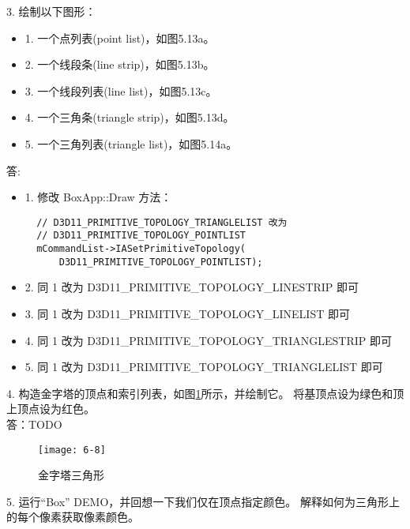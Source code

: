 \begin{flushleft}
3. 绘制以下图形：\\
\begin{itemize}
  \item 1. 一个点列表(point list)，如图5.13a。
  \item 2. 一个线段条(line strip)，如图5.13b。
  \item 3. 一个线段列表(line list)，如图5.13c。
  \item 4. 一个三角条(triangle strip)，如图5.13d。
  \item 5. 一个三角列表(triangle list)，如图5.14a。
\end{itemize}
答: \\
\begin{itemize}
  \item 1. 修改 BoxApp::Draw 方法：\\
  \begin{lstlisting}
  // D3D11_PRIMITIVE_TOPOLOGY_TRIANGLELIST 改为 
  // D3D11_PRIMITIVE_TOPOLOGY_POINTLIST
  mCommandList->IASetPrimitiveTopology(
      D3D11_PRIMITIVE_TOPOLOGY_POINTLIST);
  \end{lstlisting}
  \item 2. 同 1 改为 D3D11\_PRIMITIVE\_TOPOLOGY\_LINESTRIP 即可
  \item 3. 同 1 改为 D3D11\_PRIMITIVE\_TOPOLOGY\_LINELIST 即可
  \item 4. 同 1 改为 D3D11\_PRIMITIVE\_TOPOLOGY\_TRIANGLESTRIP 即可
  \item 5. 同 1 改为 D3D11\_PRIMITIVE\_TOPOLOGY\_TRIANGLELIST 即可
\end{itemize}

\end{flushleft}

\begin{flushleft}
4. 构造金字塔的顶点和索引列表，如图\ref{fig:6-8}所示，并绘制它。 将基顶点设为绿色和顶上顶点设为红色。\\
答：TODO
\end{flushleft}
\begin{figure}[h]
    \texttt{[image: 6-8]}
    \centering
    \caption{金字塔三角形}
    \label{fig:6-8}
\end{figure}
\begin{flushleft}
5. 运行“Box” DEMO，并回想一下我们仅在顶点指定颜色。 解释如何为三角形上的每个像素获取像素颜色。
\end{flushleft}

